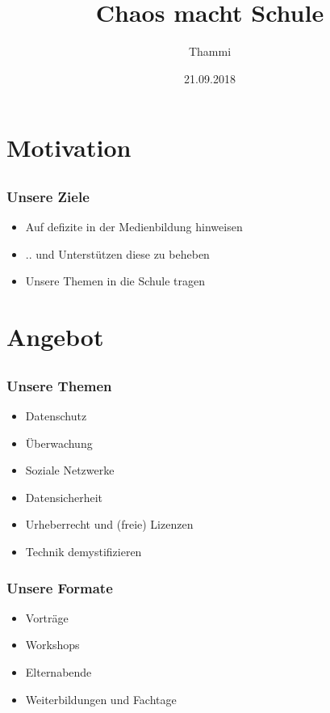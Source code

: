 \documentclass[aspectratio=169]{beamer}
\title{Chaos macht Schule}
\author{Thammi}
\date{21.09.2018}
\begin{document}
\maketitle

\section*{Motivation}
\subsection*{}

\begin{frame}[t]
	\frametitle{Unsere Ziele}
	\begin{itemize}
    \item<2-> Auf defizite in der Medienbildung hinweisen
		\item<3-> .. und Unterstützen diese zu beheben
		\item<4-> Unsere Themen in die Schule tragen
	\end{itemize}
\end{frame}

\section*{Angebot}
\subsection*{}

\begin{frame}
	\frametitle{Unsere Themen}
	\begin{itemize}
    \item Datenschutz
		\item Überwachung
		\item Soziale Netzwerke
    \item Datensicherheit
    \item Urheberrecht und (freie) Lizenzen
		\item Technik demystifizieren
	\end{itemize}
\end{frame}

\begin{frame}
	\frametitle{Unsere Formate}
	\begin{itemize}
    \item<2-> Vorträge
		\item<3-> Workshops
		\item<4-> Elternabende
    \item<5-> Weiterbildungen und Fachtage
	\end{itemize}
\end{frame}
\end{document}
